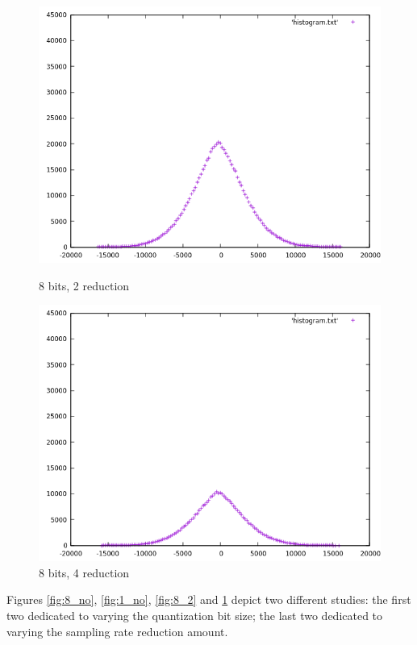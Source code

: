 \documentclass[12pt]{article}
\begin{document}
\begin{figure}[H]
\begin{minipage}{.5\textwidth}
    \includegraphics[width=\linewidth]{sample01_8_2.png}
    \caption{{8 bits, 2 reduction}}
    \label{fig:8_2}
  \end{minipage}
  \begin{minipage}{.5\textwidth}
    \centering
    \includegraphics[width=\linewidth]{sample01_8_4.png}
    \caption{{8 bits, 4 reduction}}
    \label{fig:8_4}
  \end{minipage}
\end{figure}

Figures \ref{fig:8_no}, \ref{fig:1_no}, \ref{fig:8_2} and \ref{fig:8_4} depict 
two different studies: 
the first two dedicated to varying the quantization bit size;
the last two dedicated to varying the sampling rate reduction amount. 
\end{document}
